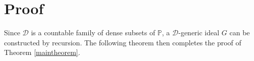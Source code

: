 \documentclass[10pt,a4paper, openany,  oldfontcommands]{memoir}
\newtheorem{open problem} [theorem] {Open Problem}
\begin{document}
\section{Proof}

Since  $  \mathcal{D} $ is a countable family of dense subsets of  $  \mathbb{P} $, 
a $   \mathcal{D} $-generic ideal  $G$ can be constructed by recursion. 
The following theorem  then    completes the proof of Theorem  \ref{maintheorem}. 
 
\end{document}
